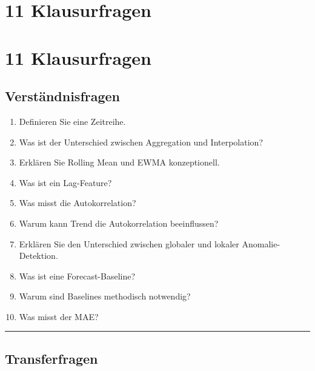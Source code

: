 \documentclass[
  ngerman,
  letterpaper,
  DIV=11]{scrreprt}
\providecommand{\tightlist}{%
  \setlength{\itemsep}{0pt}\setlength{\parskip}{0pt}}
\begin{document}

\chapter{11 Klausurfragen}\label{klausurfragen}


\chapter{11 Klausurfragen}\label{klausurfragen-1}

\section{Verständnisfragen}\label{verstuxe4ndnisfragen-1}

\begin{enumerate}
\def\labelenumi{\arabic{enumi}.}
\tightlist
\item
  Definieren Sie eine Zeitreihe.
\item
  Was ist der Unterschied zwischen Aggregation und Interpolation?
\item
  Erklären Sie Rolling Mean und EWMA konzeptionell.
\item
  Was ist ein Lag-Feature?
\item
  Was misst die Autokorrelation?
\item
  Warum kann Trend die Autokorrelation beeinflussen?
\item
  Erklären Sie den Unterschied zwischen globaler und lokaler
  Anomalie-Detektion.
\item
  Was ist eine Forecast-Baseline?
\item
  Warum sind Baselines methodisch notwendig?
\item
  Was misst der MAE?
\end{enumerate}

\begin{center}\rule{0.5\linewidth}{0.5pt}\end{center}

\section{Transferfragen}\label{transferfragen}
\end{document}

